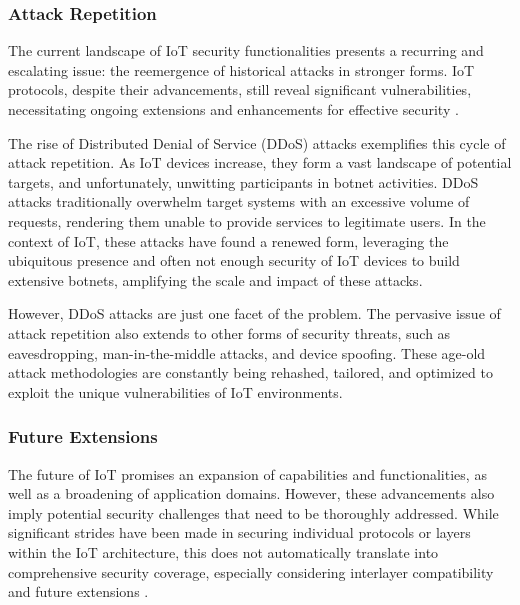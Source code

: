 \documentclass{ieeeaccess}
\begin{document}
\subsubsection{Attack Repetition}
The current landscape of IoT security functionalities presents a recurring and escalating issue: the reemergence of historical attacks in stronger forms. IoT protocols, despite their advancements, still reveal significant vulnerabilities, necessitating ongoing extensions and enhancements for effective security \cite{yang2017survey}.

The rise of Distributed Denial of Service (DDoS) attacks exemplifies this cycle of attack repetition. As IoT devices increase, they form a vast landscape of potential targets, and unfortunately, unwitting participants in botnet activities. DDoS attacks traditionally overwhelm target systems with an excessive volume of requests, rendering them unable to provide services to legitimate users. In the context of IoT, these attacks have found a renewed form, leveraging the ubiquitous presence and often not enough security of IoT devices to build extensive botnets, amplifying the scale and impact of these attacks.

However, DDoS attacks are just one facet of the problem. The pervasive issue of attack repetition also extends to other forms of security threats, such as eavesdropping, man-in-the-middle attacks, and device spoofing. These age-old attack methodologies are constantly being rehashed, tailored, and optimized to exploit the unique vulnerabilities of IoT environments.
	
\subsubsection{Future Extensions}
The future of IoT promises an expansion of capabilities and functionalities, as well as a broadening of application domains. However, these advancements also imply potential security challenges that need to be thoroughly addressed. While significant strides have been made in securing individual protocols or layers within the IoT architecture, this does not automatically translate into comprehensive security coverage, especially considering interlayer compatibility and future extensions \cite{sicari2015security} \cite{Alaba201710}.
\end{document}
